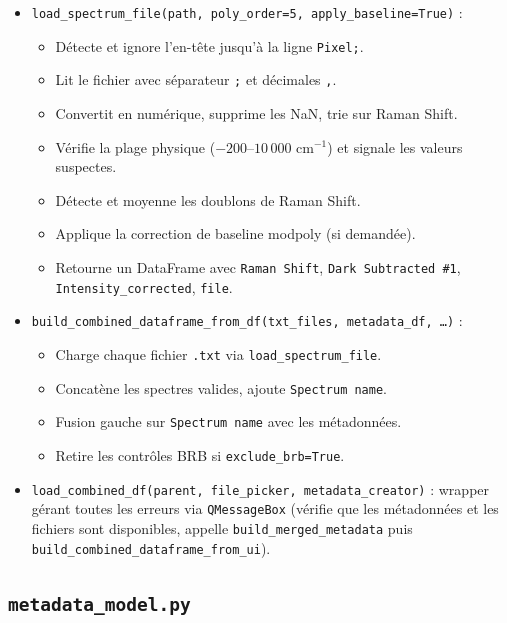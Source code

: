 \documentclass[12pt, a4paper]{article}
\begin{document}
\begin{itemize}
  \item \texttt{load\_spectrum\_file(path, poly\_order=5, apply\_baseline=True)} :
    \begin{itemize}
      \item Détecte et ignore l'en-tête jusqu'à la ligne \texttt{Pixel;}.
      \item Lit le fichier avec séparateur \texttt{;} et décimales \texttt{,}.
      \item Convertit en numérique, supprime les NaN, trie sur Raman Shift.
      \item Vérifie la plage physique ($-200$--$10\,000$ cm$^{-1}$) et signale
            les valeurs suspectes.
      \item Détecte et moyenne les doublons de Raman Shift.
      \item Applique la correction de baseline modpoly (si demandée).
      \item Retourne un DataFrame avec \texttt{Raman Shift},
            \texttt{Dark Subtracted \#1}, \texttt{Intensity\_corrected},
            \texttt{file}.
    \end{itemize}

  \item \texttt{build\_combined\_dataframe\_from\_df(txt\_files, metadata\_df, \ldots)} :
    \begin{itemize}
      \item Charge chaque fichier \texttt{.txt} via
            \texttt{load\_spectrum\_file}.
      \item Concatène les spectres valides, ajoute \texttt{Spectrum name}.
      \item Fusion gauche sur \texttt{Spectrum name} avec les métadonnées.
      \item Retire les contrôles BRB si \texttt{exclude\_brb=True}.
    \end{itemize}

  \item \texttt{load\_combined\_df(parent, file\_picker, metadata\_creator)} :
        wrapper gérant toutes les erreurs via \texttt{QMessageBox} (vérifie
        que les métadonnées et les fichiers sont disponibles, appelle
        \texttt{build\_merged\_metadata} puis \texttt{build\_combined\_dataframe\_from\_ui}).
\end{itemize}

\subsection{\texttt{metadata\_model.py}}
\end{document}
